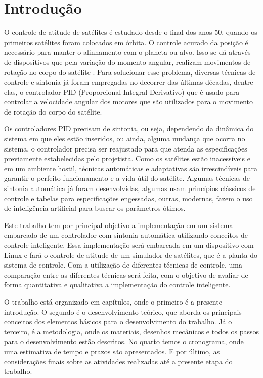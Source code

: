 \chapter[Introdução]{Introdução}

O controle de atitude de satélites é estudado desde o final dos anos 50, quando os primeiros satélites foram colocados em órbita. O controle acurado da posição é necessário para manter o alinhamento com o planeta ou alvo. Isso se dá através de dispositivos que pela variação do momento angular, realizam movimentos de rotação no corpo do satélite . Para solucionar esse problema, diversas técnicas de controle e sintonia já foram empregadas no decorrer das últimas décadas, dentre elas, o controlador PID (Proporcional-Integral-Derivativo) que é usado para controlar a velocidade angular dos motores que são utilizados para o movimento de rotação do corpo do satélite.

Os controladores PID precisam de sintonia, ou seja, dependendo da dinâmica do sistema em que eles estão inseridos, ou ainda, alguma mudança que ocorra no sistema, o controlador precisa ser reajustado para que atenda as especificações previamente estabelecidas pelo projetista. Como os satélites estão inacessíveis e em um ambiente hostil, técnicas automáticas e adaptativas são irrescindíveis para garantir o perfeito funcionamento e a vida útil do satélite. Algumas técnicas de sintonia automática já foram desenvolvidas, algumas usam princípios clássicos de controle e tabelas para especificações engessadas, outras, modernas, fazem o uso de inteligência artificial para buscar os parâmetros ótimos.


Este trabalho tem por principal objetivo a implementação em um sistema embarcado de um controlador com sintonia automática utilizando conceitos de controle inteligente. Essa implementação será embarcada em um dispositivo com Linux  e fará o controle de atitude de um simulador de satélites, que é a planta do sistema de controle. Com a utilização de diferentes técnicas de controle, uma comparação entre as diferentes técnicas será feita, com o objetivo de avaliar de forma quantitativa e qualitativa a implementação do controle inteligente.

O trabalho está organizado em capítulos, onde o primeiro é a presente introdução. O segundo é o desenvolvimento teórico, que aborda os principais conceitos dos elementos básicos para o desenvolvimento do trabalho. Já o terceiro, é a metodologia, onde os materiais, desenhos mecânicos e todos os passos para o desenvolvimento estão descritos. No quarto temos o cronograma, onde uma estimativa de tempo e prazos são apresentados. E por último, as considerações finais sobre as atividades realizadas até a presente etapa do trabalho.











